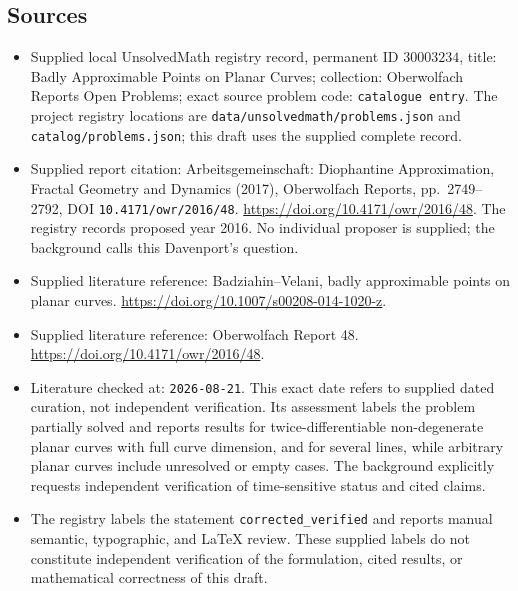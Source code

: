 \documentclass[11pt]{article}
\begin{document}
\subsection{Sources}
\begin{itemize}
\item Supplied local UnsolvedMath registry record, permanent ID \(30003234\), title: Badly Approximable Points on Planar Curves; collection: Oberwolfach Reports Open Problems; exact source problem code: \texttt{catalogue entry}. The project registry locations are \texttt{data/unsolvedmath/problems.json} and \texttt{catalog/problems.json}; this draft uses the supplied complete record.
\item Supplied report citation: Arbeitsgemeinschaft: Diophantine Approximation, Fractal Geometry and Dynamics (2017), Oberwolfach Reports, pp.\ 2749--2792, DOI \texttt{10.4171/owr/2016/48}. \url{https://doi.org/10.4171/owr/2016/48}. The registry records proposed year 2016. No individual proposer is supplied; the background calls this Davenport's question.
\item Supplied literature reference: Badziahin--Velani, badly approximable points on planar curves. \url{https://doi.org/10.1007/s00208-014-1020-z}.
\item Supplied literature reference: Oberwolfach Report 48. \url{https://doi.org/10.4171/owr/2016/48}.
\item Literature checked at: \texttt{2026-08-21}. This exact date refers to supplied dated curation, not independent verification. Its assessment labels the problem partially solved and reports results for twice-differentiable non-degenerate planar curves with full curve dimension, and for several lines, while arbitrary planar curves include unresolved or empty cases. The background explicitly requests independent verification of time-sensitive status and cited claims.
\item The registry labels the statement \texttt{corrected\_verified} and reports manual semantic, typographic, and LaTeX review. These supplied labels do not constitute independent verification of the formulation, cited results, or mathematical correctness of this draft.
\end{itemize}
\end{document}
